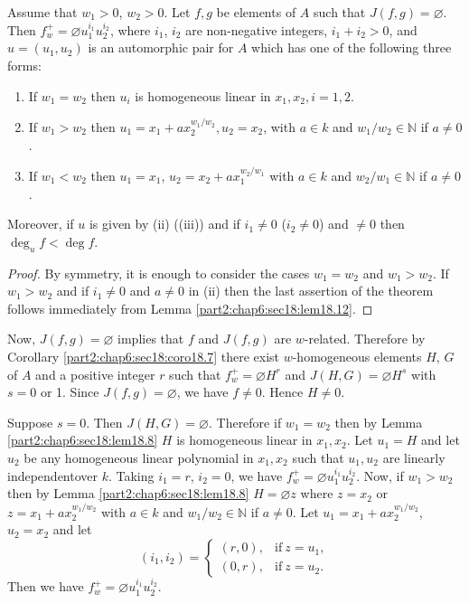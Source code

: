\begin{thm}\label{part2:chap6:sec18:thm18.13}
  Assume that $w_1>0$, $w_2> 0$. Let $f, g$ be elements of $A$ such
  that $J(f, g) = \diameter$. Then $f_w^+= \diameter u_1^{i_1}
  u_2^{i_2}$, where $i_1$, $i_2$ are non-negative integers, $i_1 +i_2
  > 0$, and $u=(u_1, u_2)$ is an automorphic pair for $A$ which has
  one of the following three forms:
  \begin{enumerate}[\rm (i)]
  \item If $w_1 = w_2$ then $u_i$ is homogeneous linear in $x_1, x_2,
    i=1, 2$.

    \item If $w_1 > w_2$ then $u_1= x_1 + ax_2^{w_1/w_2}, u_2 = x_2$,
      with $a \in k$ and $w_1/w_2 \in \mathbb{N}$ if $a \neq 0$.

      \item If $w_1 < w_2$ then $u_1 = x_1$, $u_2=x_2 +
        ax_1^{w_2/w_1}$ with $a \in k$ and $w_2/w_1 \in \mathbb{N}$ if
        $a \neq 0$.
  \end{enumerate}
  Moreover, if $u$ is given by (ii) (\resp (iii)) and if $i_1 \neq 0$
  (\resp $i_2 \neq 0$) and $\neq 0$ then $\deg_u f < \deg f$.
\end{thm}

\begin{proof}
  By symmetry, it is enough to consider the cases $w_1 = w_2$ and
  $w_1> w_2$. If $w_1> w_2$ and if $i_1 \neq 0$ and $a \neq 0$ in (ii)
  then the last assertion of the theorem follows immediately from
  Lemma \ref{part2:chap6:sec18:lem18.12}.
\end{proof}

Now, $J (f, g)= \diameter $ implies that $f$ and $J(f, g)$ are
$w$-related. Therefore by Corollary \ref{part2:chap6:sec18:coro18.7}
there exist $w$-homogeneous elements $H$, $G$ of $A$ and a positive
integer $r$ such that $f_w^+= \diameter H^r$ and $J(H, G)= \diameter
H^s$ with $s=0$ or 1. Since $J(f, g)= \diameter$, we have $f \neq
0$. Hence $H \neq 0$.

Suppose $s=0$. Then $J(H, G)= \diameter$. Therefore if $w_1= w_2$ then
by Lemma \ref{part2:chap6:sec18:lem18.8} $H$ is homogeneous linear in
$x_1, x_2$. Let $u_1 = H$ and let $u_2$ be any homogeneous linear
polynomial in $x_1, x_2$ such that $u_1,u_2$ are linearly
independent\pageoriginale over $k$. Taking $i_1 = r$, $i_2=0$, we have
$f_w^+= \diameter u_1^{i_1} u_2^{i_2}$. Now, if $w_1 > w_2$ then by
Lemma \ref{part2:chap6:sec18:lem18.8} $H = \diameter z$ where $z= x_2$
or $z= x_1 +ax_2^{w_1/w_2}$ with $a \in k$ and $w_1/w_2 \in
\mathbb{N}$ if $a \neq 0$. Let $u_1= x_1 + ax_2^{w_1/w_2}$, $u_2 =x_2$
and let 
$$
(i_1, i_2)=
\begin{cases}
  (r, 0), & \text{if}~ z= u_1,\\
  (0, r), & \text{if}~ z= u_2.
\end{cases}
$$
Then we have $f_w^+= \diameter u_1^{i_1} u_2^{i_2}$.

